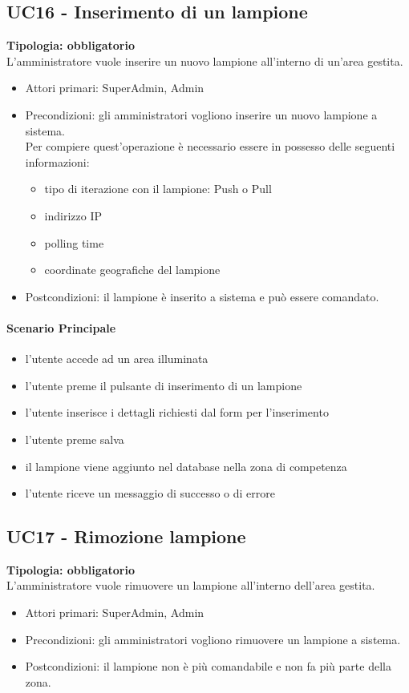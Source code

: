 \documentclass[12pt]{article}
\begin{document}
\subsection{UC16 - Inserimento di un lampione}
\textbf{Tipologia: obbligatorio}\\
L'amministratore vuole inserire un nuovo lampione all'interno di un'area gestita.
\begin{itemize}
	\item Attori primari: SuperAdmin, Admin
	\item Precondizioni: gli amministratori vogliono inserire un nuovo lampione a sistema.\\
	 Per compiere quest'operazione è necessario essere in possesso delle seguenti informazioni: 
	\begin{itemize}
		\item tipo di iterazione con il lampione: Push o Pull
		\item indirizzo IP
		\item polling time
		\item coordinate geografiche del lampione
	\end{itemize}
	\item Postcondizioni: il lampione è inserito a sistema e può essere comandato.
\end{itemize}
\paragraph{Scenario Principale}
\begin{itemize}
	\item l'utente accede ad un area illuminata
	\item l'utente preme il pulsante di inserimento di un lampione
	\item l'utente inserisce i dettagli richiesti dal form per l'inserimento
	\item l'utente preme salva
	\item il lampione viene aggiunto nel database nella zona di competenza
	\item l'utente riceve un messaggio di successo o di errore
\end{itemize}


\subsection{UC17 - Rimozione lampione}
\textbf{Tipologia: obbligatorio}\\
L'amministratore vuole rimuovere un lampione all'interno dell'area gestita.
\begin{itemize}
	\item Attori primari: SuperAdmin, Admin
	\item Precondizioni: gli amministratori vogliono rimuovere un lampione a sistema.\\
	\item Postcondizioni: il lampione non è più comandabile e non fa più parte della zona.
\end{itemize}
\end{document}
